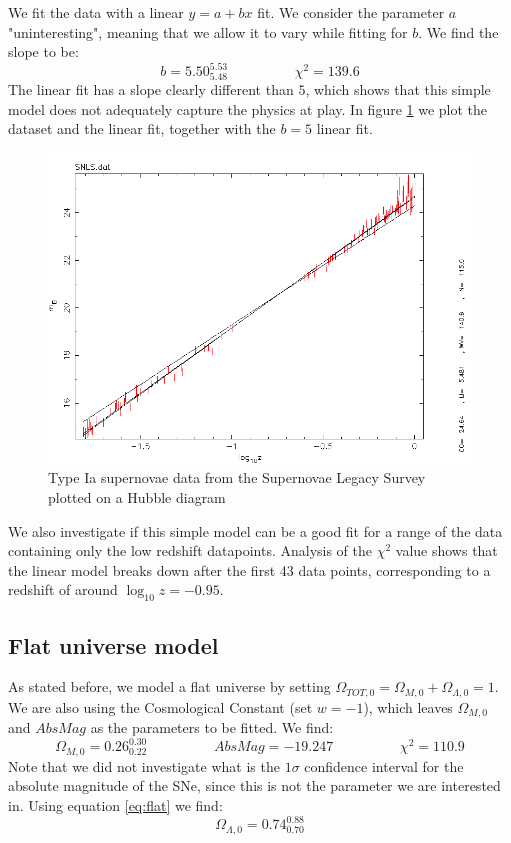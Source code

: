 \documentclass[11pt]{article}
\begin{document}
We fit the data with a linear $y = a + b x$ fit. We consider the parameter $a$ "uninteresting", meaning that we allow it to vary while fitting for $b$. We find the slope to be: 
\begin{equation}
	b = 5.50^{5.53}_{5.48} 
	\hspace{2cm}
	\chi^2 = 139.6
	\label{res:lin}
\end{equation}
The linear fit has a slope clearly different than $5$, which shows that this simple model does not adequately capture the physics at play. In figure \ref{fig:snls} we plot the dataset and the linear fit, together with the $b = 5$ linear fit. 
\begin{figure}[htbp]
	\centering
	\includegraphics[width=0.8\linewidth]{snls.png}
	\caption{Type Ia supernovae data from the Supernovae Legacy Survey plotted on a Hubble diagram}
	\label{fig:snls}
\end{figure}
We also investigate if this simple model can be a good fit for a range of the data containing only the low redshift datapoints. Analysis of the $\chi^2$ value shows that the linear model breaks down after the first 43 data points, corresponding to a redshift of around $\log_{10}z = -0.95$. 

\subsection{Flat universe model} \label{sec:flat}
As stated before, we model a flat universe by setting $\Omega_{TOT,0} = \Omega_{M,0} + \Omega_{\Lambda,0} = 1$. We are also using the Cosmological Constant (set $w = -1$), which leaves  $\Omega_{M,0}$ and $AbsMag$ as the parameters to be fitted. We find: 
\begin{equation}
	\Omega_{M,0} = 0.26^{0.30}_{0.22} 
	\hspace{2cm}
	AbsMag = -19.247
	\hspace{2cm}
	\chi^2 = 110.9
	\label{res:flatM}
\end{equation}
Note that we did not investigate what is the $1\sigma$ confidence interval for the absolute magnitude of the SNe, since this is not the parameter we are interested in. Using equation \eqref{eq:flat} we find: 
\begin{equation}
	\Omega_{\Lambda,0} = 0.74^{0.88}_{0.70} 
	\label{res:flatL}
\end{equation}
\end{document}
